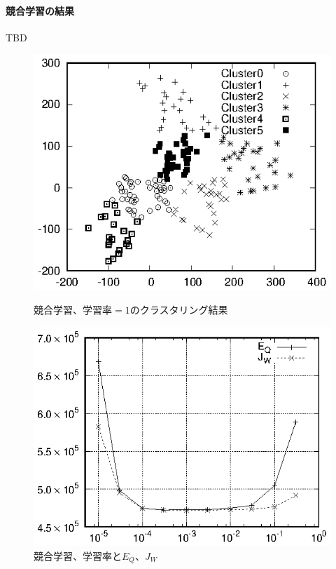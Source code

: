 \documentclass[a4j]{jarticle}
\begin{document}
\paragraph{競合学習の結果}
TBD

\begin{figure}[tbp]
 \begin{minipage}{0.5\hsize}
  \begin{center}
   \includegraphics[width=\hsize]{fig/Hokkaido_xyl_compLearn.eps}
  \end{center}
  \caption{競合学習、学習率$=1$のクラスタリング結果}
  \label{fig:compLearn-map}
 \end{minipage}
 \begin{minipage}{0.5\hsize}
  \begin{center}
   \includegraphics[width=\hsize]{fig/compLearn.eps}
  \end{center}
  \caption{競合学習、学習率と$E_Q$、$J_W$}
  \label{fig:compLearn}
 \end{minipage}
\end{figure}
\end{document}
